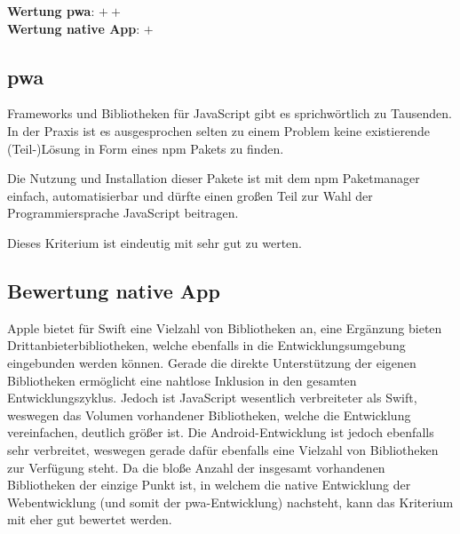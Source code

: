 \textbf{Wertung \ac{pwa}}: $++$\\
\textbf{Wertung native App}: $+$ \\

\subsection{\ac{pwa}}
Frameworks und Bibliotheken für JavaScript gibt es sprichwörtlich zu Tausenden. In der Praxis ist es ausgesprochen selten zu einem Problem keine existierende (Teil-)Lösung in Form eines npm Pakets zu finden.

Die Nutzung und Installation dieser Pakete ist mit dem npm Paketmanager einfach, automatisierbar und dürfte einen großen Teil zur Wahl der Programmiersprache JavaScript beitragen.

Dieses Kriterium ist eindeutig mit sehr gut zu werten.

\subsection{Bewertung native App}
Apple bietet für Swift eine Vielzahl von Bibliotheken an, eine Ergänzung bieten Drittanbieterbibliotheken, welche ebenfalls in die Entwicklungsumgebung eingebunden werden können. Gerade die direkte Unterstützung der eigenen Bibliotheken ermöglicht eine nahtlose Inklusion in den gesamten Entwicklungszyklus. Jedoch ist JavaScript wesentlich verbreiteter als Swift, weswegen das Volumen vorhandener Bibliotheken, welche die Entwicklung vereinfachen, deutlich größer ist. Die Android-Entwicklung ist jedoch ebenfalls sehr verbreitet, weswegen gerade dafür ebenfalls eine Vielzahl von Bibliotheken zur Verfügung steht. Da die bloße Anzahl der insgesamt vorhandenen Bibliotheken der einzige Punkt ist, in welchem die native Entwicklung der Webentwicklung (und somit der \ac{pwa}-Entwicklung) nachsteht, kann das Kriterium mit eher gut bewertet werden.